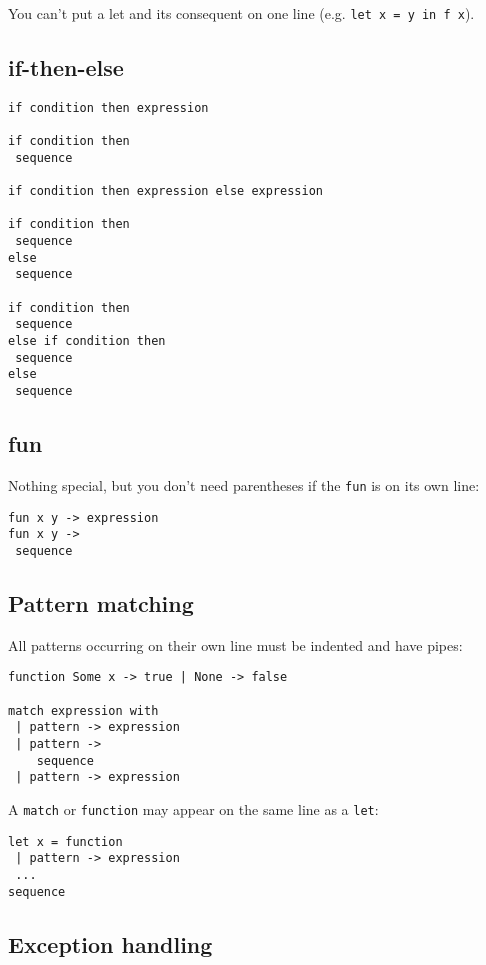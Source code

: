 \documentclass{article}
\begin{document}
\noindent You can't put a let and its consequent on one line (e.g. {\tt let x = y in f x}).

\subsection*{if-then-else}

\begin{verbatim}
if condition then expression

if condition then
 sequence

if condition then expression else expression

if condition then
 sequence
else
 sequence

if condition then
 sequence
else if condition then
 sequence
else
 sequence 
\end{verbatim}

\subsection*{fun}

Nothing special, but you don't need parentheses if the {\tt fun} is on its own line:
\begin{verbatim}
fun x y -> expression
fun x y ->
 sequence
\end{verbatim}

\subsection*{Pattern matching}

All patterns occurring on their own line must be indented and have pipes:

\begin{verbatim}
function Some x -> true | None -> false

match expression with
 | pattern -> expression
 | pattern ->
    sequence
 | pattern -> expression
\end{verbatim}

\noindent A {\tt match} or {\tt function} may appear on the same line as a {\tt let}:

\begin{verbatim}
let x = function
 | pattern -> expression
 ...
sequence
\end{verbatim}

\subsection*{Exception handling}
\end{document}
